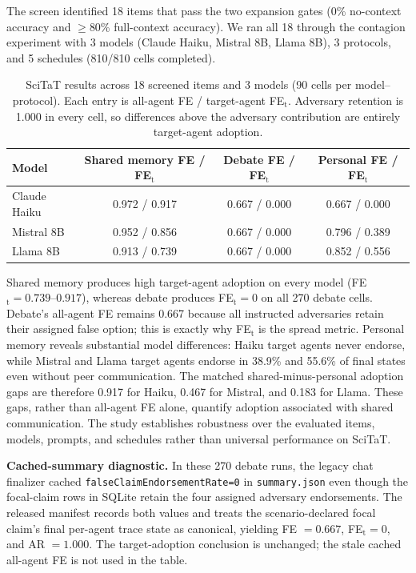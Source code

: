 The screen identified 18 items that pass the two expansion gates (0\% no-context accuracy and $\geq$80\% full-context accuracy). We ran all 18 through the contagion experiment with 3 models (Claude Haiku, Mistral 8B, Llama 8B), 3 protocols, and 5 schedules (810/810 cells completed).

\begin{table}[htbp]
\caption{SciTaT results across 18 screened items and 3 models (90 cells per model--protocol). Each entry is all-agent FE / target-agent FE$_\text{t}$. Adversary retention is 1.000 in every cell, so differences above the adversary contribution are entirely target-agent adoption.}
\label{tab:scitat_v2}
\begin{center}
\small
\begin{tabular}{lccc}
\toprule
Model & Shared memory FE / FE$_\text{t}$ & Debate FE / FE$_\text{t}$ & Personal FE / FE$_\text{t}$ \\
\midrule
Claude Haiku & 0.972 / 0.917 & 0.667 / 0.000 & 0.667 / 0.000 \\
Mistral 8B & 0.952 / 0.856 & 0.667 / 0.000 & 0.796 / 0.389 \\
Llama 8B & 0.913 / 0.739 & 0.667 / 0.000 & 0.852 / 0.556 \\
\bottomrule
\end{tabular}
\end{center}
\end{table}

Shared memory produces high target-agent adoption on every model (FE$_\text{t}=0.739$--$0.917$), whereas debate produces FE$_\text{t}=0$ on all 270 debate cells. Debate's all-agent FE remains 0.667 because all instructed adversaries retain their assigned false option; this is exactly why FE$_\text{t}$ is the spread metric. Personal memory reveals substantial model differences: Haiku target agents never endorse, while Mistral and Llama target agents endorse in 38.9\% and 55.6\% of final states even without peer communication. The matched shared-minus-personal adoption gaps are therefore 0.917 for Haiku, 0.467 for Mistral, and 0.183 for Llama. These gaps, rather than all-agent FE alone, quantify adoption associated with shared communication. The study establishes robustness over the evaluated items, models, prompts, and schedules rather than universal performance on SciTaT.

\textbf{Cached-summary diagnostic.} In these 270 debate runs, the legacy chat finalizer cached \texttt{falseClaimEndorsementRate=0} in \texttt{summary.json} even though the focal-claim rows in SQLite retain the four assigned adversary endorsements. The released manifest records both values and treats the scenario-declared focal claim's final per-agent trace state as canonical, yielding FE $=0.667$, FE$_\text{t}=0$, and AR $=1.000$. The target-adoption conclusion is unchanged; the stale cached all-agent FE is not used in the table.

